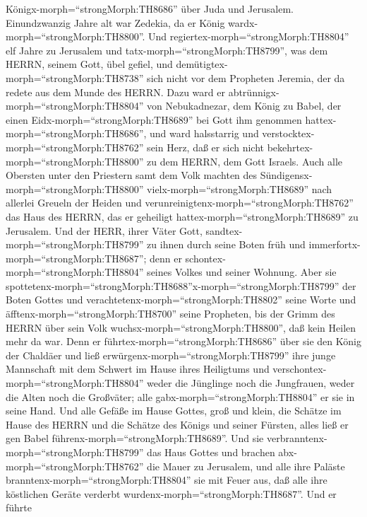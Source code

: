 Königx-morph=``strongMorph:TH8686'' über Juda und Jerusalem.
 Einundzwanzig Jahre alt war Zedekia, da er König
wardx-morph=``strongMorph:TH8800''. Und
regiertex-morph=``strongMorph:TH8804'' elf Jahre zu Jerusalem
 und tatx-morph=``strongMorph:TH8799'', was dem HERRN,
seinem Gott, übel gefiel, und demütigtex-morph=``strongMorph:TH8738''
sich nicht vor dem Propheten Jeremia, der da redete aus dem Munde des
HERRN.  Dazu ward er
abtrünnigx-morph=``strongMorph:TH8804'' von Nebukadnezar, dem König zu
Babel, der einen Eidx-morph=``strongMorph:TH8689'' bei Gott ihm genommen
hattex-morph=``strongMorph:TH8686'', und ward halsstarrig und
verstocktex-morph=``strongMorph:TH8762'' sein Herz, daß er sich nicht
bekehrtex-morph=``strongMorph:TH8800'' zu dem HERRN, dem Gott Israels.
 Auch alle Obersten unter den Priestern samt dem Volk
machten des Sündigensx-morph=``strongMorph:TH8800''
vielx-morph=``strongMorph:TH8689'' nach allerlei Greueln der Heiden und
verunreinigtenx-morph=``strongMorph:TH8762'' das Haus des HERRN, das er
geheiligt hattex-morph=``strongMorph:TH8689'' zu Jerusalem.
 Und der HERR, ihrer Väter Gott,
sandtex-morph=``strongMorph:TH8799'' zu ihnen durch seine Boten früh und
immerfortx-morph=``strongMorph:TH8687''; denn er
schontex-morph=``strongMorph:TH8804'' seines Volkes und seiner Wohnung.
 Aber sie
spottetenx-morph=``strongMorph:TH8688''x-morph=``strongMorph:TH8799''
der Boten Gottes und verachtetenx-morph=``strongMorph:TH8802'' seine
Worte und äfftenx-morph=``strongMorph:TH8700'' seine Propheten, bis der
Grimm des HERRN über sein Volk wuchsx-morph=``strongMorph:TH8800'', daß
kein Heilen mehr da war.  Denn er
führtex-morph=``strongMorph:TH8686'' über sie den König der Chaldäer und
ließ erwürgenx-morph=``strongMorph:TH8799'' ihre junge Mannschaft mit
dem Schwert im Hause ihres Heiligtums und
verschontex-morph=``strongMorph:TH8804'' weder die Jünglinge noch die
Jungfrauen, weder die Alten noch die Großväter; alle
gabx-morph=``strongMorph:TH8804'' er sie in seine Hand. 
Und alle Gefäße im Hause Gottes, groß und klein, die Schätze im Hause
des HERRN und die Schätze des Königs und seiner Fürsten, alles ließ er
gen Babel führenx-morph=``strongMorph:TH8689''.  Und sie
verbranntenx-morph=``strongMorph:TH8799'' das Haus Gottes und brachen
abx-morph=``strongMorph:TH8762'' die Mauer zu Jerusalem, und alle ihre
Paläste branntenx-morph=``strongMorph:TH8804'' sie mit Feuer aus, daß
alle ihre köstlichen Geräte verderbt
wurdenx-morph=``strongMorph:TH8687''.  Und er führte
